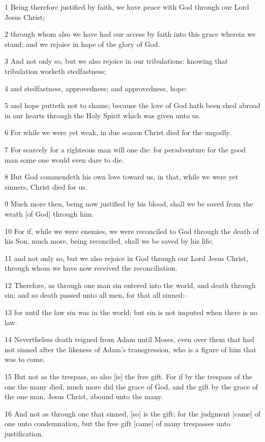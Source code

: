 \par 1 Being therefore justified by faith, we have peace with God through our Lord Jesus Christ;
\par 2 through whom also we have had our access by faith into this grace wherein we stand; and we rejoice in hope of the glory of God.
\par 3 And not only so, but we also rejoice in our tribulations: knowing that tribulation worketh stedfastness;
\par 4 and stedfastness, approvedness; and approvedness, hope:
\par 5 and hope putteth not to shame; because the love of God hath been shed abroad in our hearts through the Holy Spirit which was given unto us.
\par 6 For while we were yet weak, in due season Christ died for the ungodly.
\par 7 For scarcely for a righteous man will one die: for peradventure for the good man some one would even dare to die.
\par 8 But God commendeth his own love toward us, in that, while we were yet sinners, Christ died for us.
\par 9 Much more then, being now justified by his blood, shall we be saved from the wrath [of God] through him.
\par 10 For if, while we were enemies, we were reconciled to God through the death of his Son, much more, being reconciled, shall we be saved by his life;
\par 11 and not only so, but we also rejoice in God through our Lord Jesus Christ, through whom we have now received the reconciliation.
\par 12 Therefore, as through one man sin entered into the world, and death through sin; and so death passed unto all men, for that all sinned:--
\par 13 for until the law sin was in the world; but sin is not imputed when there is no law.
\par 14 Nevertheless death reigned from Adam until Moses, even over them that had not sinned after the likeness of Adam's transgression, who is a figure of him that was to come.
\par 15 But not as the trespass, so also [is] the free gift. For if by the trespass of the one the many died, much more did the grace of God, and the gift by the grace of the one man, Jesus Christ, abound unto the many.
\par 16 And not as through one that sinned, [so] is the gift: for the judgment [came] of one unto condemnation, but the free gift [came] of many trespasses unto justification.
